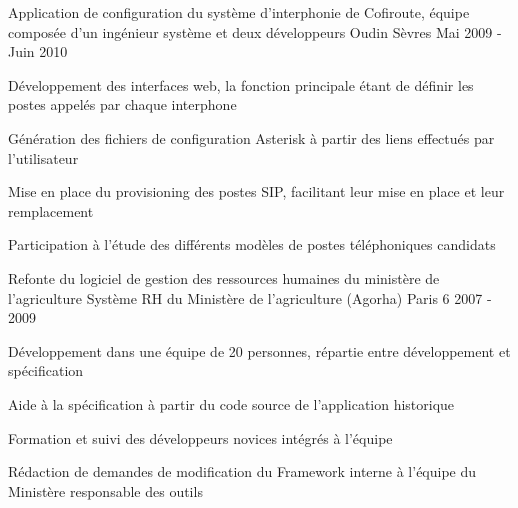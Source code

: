 \begin{cventries}
  \cventry
    {Application de configuration du système d’interphonie de Cofiroute, équipe composée d'un ingénieur système et deux développeurs} %
    {Oudin} %
    {Sèvres} %
    {Mai 2009 - Juin 2010} %
    {
      \begin{cvitems} %
        \item {Développement des interfaces web, la fonction principale étant de définir les postes appelés par chaque interphone}
        \item {Génération des fichiers de configuration Asterisk à partir des liens effectués par l'utilisateur}
        \item {Mise en place du provisioning des postes SIP, facilitant leur mise en place et leur remplacement}
        \item {Participation à l'étude des différents modèles de postes téléphoniques candidats}
      \end{cvitems}
    }




\end{cventries}



\begin{cventries}
  \cventry
    {Refonte du logiciel de gestion des ressources humaines du ministère de l'agriculture} %
    {Système RH du Ministère de l'agriculture (Agorha)} %
    {Paris 6} %
    {2007 - 2009} %
    {
      \begin{cvitems} %
        \item {Développement dans une équipe de 20 personnes, répartie entre développement et spécification}
        \item {Aide à la spécification à partir du code source de l'application historique}
        \item {Formation et suivi des développeurs novices intégrés à l'équipe}
        \item {Rédaction de demandes de modification du Framework interne à l'équipe du Ministère responsable des outils}
      \end{cvitems}
    }
\end{cventries}

